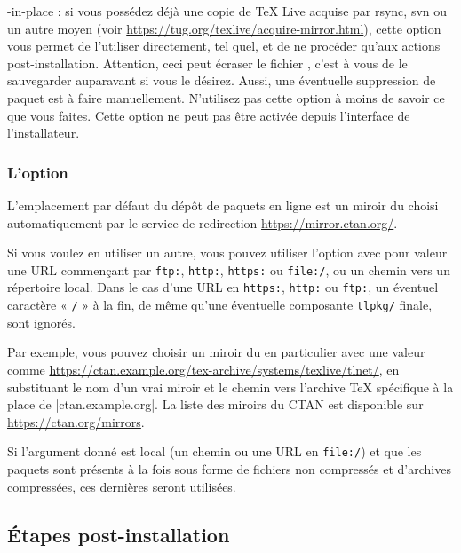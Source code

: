 \documentclass[german, english, french, 12pt]{article}
\renewcommand{\TL}{\TeX{} Live\xspace}%
\begin{document}
\begin{ttdescription}
\item[-in-place] : si vous possédez déjà une copie de \TL{} acquise par rsync,
  svn ou un autre moyen (voir
  \url{https://tug.org/texlive/acquire-mirror.html}), cette option vous permet
  de l'utiliser directement, tel quel, et de ne procéder qu'aux actions
  post-installation. Attention, ceci peut écraser le fichier
  , c'est à vous de le sauvegarder auparavant si
  vous le désirez. Aussi, une éventuelle suppression de paquet est à faire
  manuellement. N'utilisez pas cette option à moins de savoir ce que vous
  faites. Cette option ne peut pas être activée depuis l'interface de
  l'installateur.
\end{ttdescription}

\subsubsection{L'option }
\label{sec:location}

L'emplacement par défaut du dépôt de paquets en ligne est un miroir du \CTAN{}
choisi automatiquement par le service de redirection
\url{https://mirror.ctan.org/}.

Si vous voulez en utiliser un autre, vous pouvez utiliser l'option
 avec pour valeur une URL commençant par \texttt{ftp:},
\texttt{http:}, \texttt{https:} ou \texttt{file:/}, ou un chemin vers un
répertoire local.  Dans le cas d'une URL en \texttt{https:}, \texttt{http:} ou
\texttt{ftp:}, un éventuel caractère « \texttt{/} » à la fin, de même qu'une
éventuelle composante \texttt{tlpkg/} finale, sont ignorés.

Par exemple, vous pouvez choisir un miroir du \CTAN{} en particulier avec une
valeur comme \url{https://ctan.example.org/tex-archive/systems/texlive/tlnet/},
en substituant le nom d'un vrai miroir et le chemin vers l'archive \TeX{}
spécifique à la place de |ctan.example.org|. La liste des miroirs du CTAN est
disponible sur \url{https://ctan.org/mirrors}.

Si l'argument donné est local (un chemin ou une URL en \texttt{file:/}) et que
les paquets sont présents à la fois sous forme de fichiers non compressés et
d'archives compressées, ces dernières seront utilisées.

\subsection{Étapes post-installation}
\label{sec:postinstall}
\end{document}
